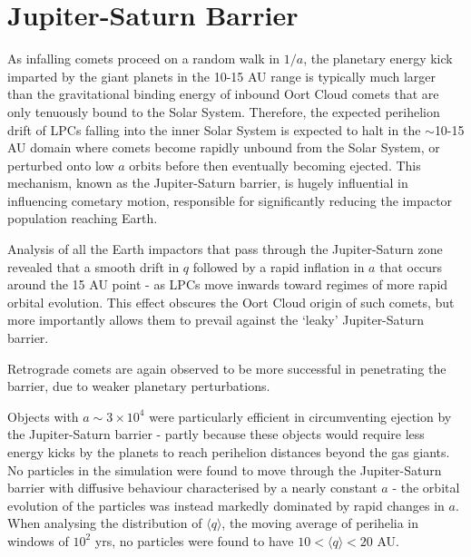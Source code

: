 

\section{Jupiter-Saturn Barrier}
\label{js-barrier}
As infalling comets proceed on a random walk in $1/a$, the planetary energy kick imparted by the giant planets in the 10-15 AU range is typically much larger than the gravitational binding energy of inbound Oort Cloud comets that are only tenuously bound to the Solar System. Therefore, the expected perihelion drift of LPCs falling into the inner Solar System is expected to halt in the $\sim$10-15 AU domain where comets become rapidly unbound from the Solar System, or perturbed onto low $a$ orbits before then eventually becoming ejected. This mechanism, known as the Jupiter-Saturn barrier, is hugely influential in influencing cometary motion, responsible for significantly reducing the impactor population reaching Earth.

Analysis of all the Earth impactors that pass through the Jupiter-Saturn zone revealed that a smooth drift in $q$ followed by a rapid inflation in $a$ that occurs around the 15 AU point - as LPCs move inwards toward regimes of more rapid orbital evolution. This effect obscures the Oort Cloud origin of such comets, but more importantly allows them to prevail against the `leaky' Jupiter-Saturn barrier. 

Retrograde comets are again observed to be more successful in penetrating the barrier, due to weaker planetary perturbations.

Objects with $a\sim 3\times10^4$ were particularly efficient in circumventing ejection by the Jupiter-Saturn barrier - partly because these objects would require less energy kicks by the planets to reach perihelion distances beyond the gas giants. No particles in the simulation were found to move through the Jupiter-Saturn barrier with diffusive behaviour characterised by a nearly constant $a$ - the orbital evolution of the particles was instead markedly dominated by rapid changes in $a$. When analysing the distribution of $\langle q \rangle$, the moving average of perihelia in windows of $10^2$ yrs, no particles were found to have $10 < \langle q \rangle < 20$ AU.

